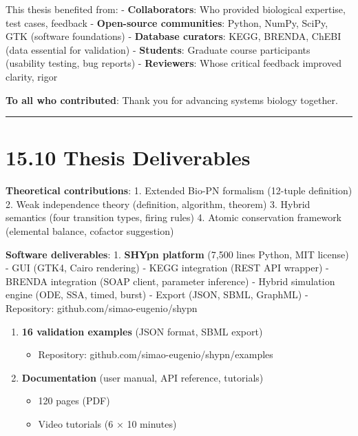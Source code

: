 This thesis benefited from: - \textbf{Collaborators}: Who provided
biological expertise, test cases, feedback - \textbf{Open-source
communities}: Python, NumPy, SciPy, GTK (software foundations) -
\textbf{Database curators}: KEGG, BRENDA, ChEBI (data essential for
validation) - \textbf{Students}: Graduate course participants (usability
testing, bug reports) - \textbf{Reviewers}: Whose critical feedback
improved clarity, rigor

\textbf{To all who contributed}: Thank you for advancing systems biology
together.

\begin{center}\rule{0.5\linewidth}{0.5pt}\end{center}

\hypertarget{thesis-deliverables}{%
\section{15.10 Thesis Deliverables}\label{thesis-deliverables}}

\textbf{Theoretical contributions}: 1. Extended Bio-PN formalism
(12-tuple definition) 2. Weak independence theory (definition,
algorithm, theorem) 3. Hybrid semantics (four transition types, firing
rules) 4. Atomic conservation framework (elemental balance, cofactor
suggestion)

\textbf{Software deliverables}: 1. \textbf{SHYpn platform} (7,500 lines
Python, MIT license) - GUI (GTK4, Cairo rendering) - KEGG integration
(REST API wrapper) - BRENDA integration (SOAP client, parameter
inference) - Hybrid simulation engine (ODE, SSA, timed, burst) - Export
(JSON, SBML, GraphML) - Repository: github.com/simao-eugenio/shypn

\begin{enumerate}
\def\labelenumi{\arabic{enumi}.}
\setcounter{enumi}{1}
\tightlist
\item
  \textbf{16 validation examples} (JSON format, SBML export)

  \begin{itemize}
  \tightlist
  \item
    Repository: github.com/simao-eugenio/shypn/examples
  \end{itemize}
\item
  \textbf{Documentation} (user manual, API reference, tutorials)

  \begin{itemize}
  \tightlist
  \item
    120 pages (PDF)
  \item
    Video tutorials (6 × 10 minutes)
  \end{itemize}
\end{enumerate}

